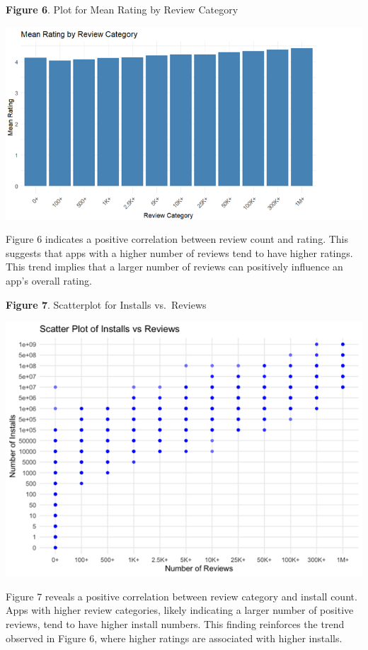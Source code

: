\documentclass[
]{article}
\begin{document}
\textbf{Figure 6}. Plot for Mean Rating by Review Category

\includegraphics{review_vs_rating.png}

Figure 6 indicates a positive correlation between review count and
rating. This suggests that apps with a higher number of reviews tend to
have higher ratings. This trend implies that a larger number of reviews
can positively influence an app's overall rating.

\textbf{Figure 7}. Scatterplot for Installs vs.~Reviews

\includegraphics{installs_vs_review.png}

Figure 7 reveals a positive correlation between review category and
install count. Apps with higher review categories, likely indicating a
larger number of positive reviews, tend to have higher install numbers.
This finding reinforces the trend observed in Figure 6, where higher
ratings are associated with higher installs.
\end{document}
